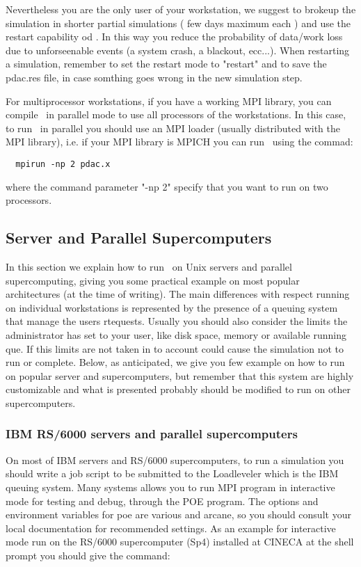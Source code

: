 Nevertheless you are the only user of your workstation,
we suggest to brokeup the simulation in shorter partial
simulations ( few days maximum each ) and use the
restart capability od \PDAC. In this way you 
reduce the probability of data/work loss due to 
unforseenable events (a system crash, a blackout, ecc...).
When restarting a simulation, remember to set the 
restart mode to "restart" and to save the pdac.res file,
in case somthing goes wrong in the new simulation step.

For multiprocessor workstations, if you have a working MPI
library, you can compile \PDAC\ in parallel mode to use
all processors of the workstations. In this case,
to run \PDAC\ in parallel you should use an MPI loader 
(usually distributed with the MPI library), i.e. if
your MPI library is MPICH you can run \PDAC\ using the commad:

\begin{verbatim}
  mpirun -np 2 pdac.x
\end{verbatim}

where the command parameter "-np 2" specify that you want
to run on two processors.

\subsection{Server and Parallel Supercomputers}

In this section we explain how to run \PDAC\ on Unix servers
and parallel supercomputing, giving you some practical example
on most popular architectures (at the time of writing).
The main differences with respect running on individual workstations
is represented by the presence of a queuing system that
manage the users rtequests. Usually you should also 
consider the limits the administrator has set to your user,
like disk space, memory or available running que. 
If this limits are not taken in to account could cause
the simulation not to run or complete.
Below, as anticipated, we give you few example on how to run
on popular server and supercomputers, but remember that 
this system are highly customizable and what is presented 
probably should be modified to run on other supercomputers.

\subsubsection{IBM RS/6000 servers and parallel supercomputers}

On most of IBM servers and RS/6000 supercomputers, to run a simulation you
should write a job script to be submitted to the Loadleveler which
is the IBM queuing system.
Many systems allows you to run MPI program in interactive mode for
testing and debug, through the POE program.  
The options and environment variables for poe are various and arcane, 
so you should consult your local documentation for recommended settings.  
As an example for interactive mode run on the RS/6000 supercomputer
(Sp4) installed at CINECA at the shell prompt you should give the
command:

